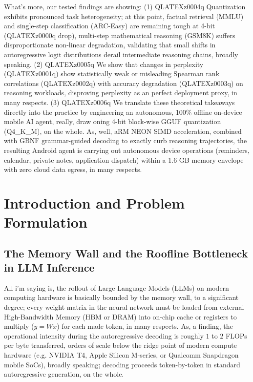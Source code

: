 \documentclass[12pt,a4paper,oneside]{report}
\begin{document}
    What's more, our tested findings are showing: (1) QLATEXz0004q Quantization exhibits pronounced task heterogeneity; at this point, factual retrieval (MMLU) and single-step classification (ARC-Easy) are remaining tough at 4-bit (QLATEXz0000q drop), multi-step mathematical reasoning (GSM8K) suffers disproportionate non-linear degradation, validating that small shifts in autoregressive logit distributions derail intermediate reasoning chains, broadly speaking. (2) QLATEXz0005q We show that changes in perplexity (QLATEXz0001q) show statistically weak or misleading Spearman rank correlations (QLATEXz0002q) with accuracy degradation (QLATEXz0003q) on reasoning workloads, disproving perplexity as an perfect deployment proxy, in many respects. (3) QLATEXz0006q We translate these theoretical takeaways directly into the practice by engineering an autonomous, 100\% offline on-device mobile AI agent, really, draw oning 4-bit block-wise GGUF quantization (Q4\_K\_M), on the whole. As, well, aRM NEON SIMD acceleration, combined with GBNF grammar-guided decoding to exactly curb reasoning trajectories, the resulting Android agent is carrying out autonomous device operations (reminders, calendar, private notes, application dispatch) within a 1.6 GB memory envelope with zero cloud data egress, in many respects.

    \newpage
    \tableofcontents
    \newpage
    \listoffigures
    \newpage
    \listoftables
    \newpage

    \chapter{Introduction and Problem Formulation}

    \section{The Memory Wall and the Roofline Bottleneck in LLM Inference}
    All i'm saying is, the rollout of Large Language Models (LLMs) on modern computing hardware is basically bounded by the memory wall, to a significant degree; every weight matrix in the neural network must be loaded from external High-Bandwidth Memory (HBM or DRAM) into on-chip cache or registers to multiply ($y = W x$) for each made token, in many respects. As, a finding, the operational intensity during the autoregressive decoding is roughly $1$ to $2$ FLOPs per byte transferred, orders of scale below the ridge point of modern compute hardware (e.g. NVIDIA T4, Apple Silicon M-series, or Qualcomm Snapdragon mobile SoCs), broadly speaking; decoding proceeds token-by-token in standard autoregressive generation, on the whole. 
\end{document}
